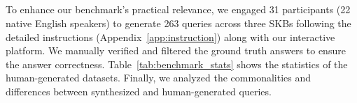\subsection{}
\label{sec:human_generated}
To enhance our benchmark's practical relevance, we engaged 31 participants (22 native English speakers) to generate 263 queries across three SKBs following the detailed instructions (Appendix~\ref{app:instruction}) along with our interactive platform. We manually verified and filtered the ground truth answers to ensure the answer correctness. Table~\ref{tab:benchmark_stats} shows the statistics of the human-generated datasets. Finally, we analyzed the commonalities and differences between synthesized and human-generated queries. 




